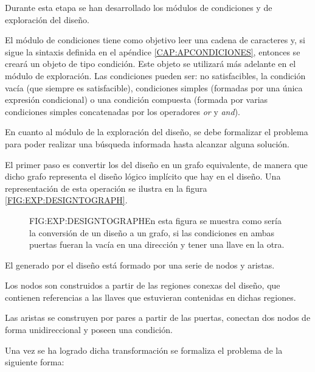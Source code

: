 Durante esta etapa se han desarrollado los módulos de condiciones y de exploración del diseño.

El módulo de condiciones tiene como objetivo leer una cadena de caracteres y, si sigue la sintaxis definida en el apéndice \ref{CAP:APCONDICIONES}, entonces se creará un objeto de tipo condición. Este objeto se utilizará más adelante en el módulo de exploración. Las condiciones pueden ser: no satisfacibles, la condición vacía (que siempre es satisfacible), condiciones simples (formadas por una única expresión condicional) o una condición compuesta (formada por varias condiciones simples concatenadas por los operadores \textit{or} y \textit{and}).

En cuanto al módulo de la exploración del diseño, se debe formalizar el problema para poder realizar una búsqueda informada hasta alcanzar alguna solución.

El primer paso es convertir los  del diseño en un grafo equivalente, de manera que dicho grafo representa el diseño lógico implícito que hay en el diseño. Una representación de esta operación se ilustra en la figura \ref{FIG:EXP:DESIGNTOGRAPH}.

\begin{figure}{FIG:EXP:DESIGNTOGRAPH}{En esta figura se muestra como sería la conversión de un diseño a un grafo, si las condiciones en ambas puertas fueran la vacía en una dirección y tener una llave en la otra.}
	 \quad
\end{figure}

El  generado por el diseño está formado por una serie de nodos y aristas.\newline

Los nodos son construidos a partir de las regiones conexas del diseño, que contienen referencias a las llaves que estuvieran contenidas en dichas regiones.\newline

Las aristas se construyen por pares a partir de las puertas, conectan dos nodos de forma unidireccional y poseen una condición.


Una vez se ha logrado dicha transformación se formaliza el problema de la siguiente forma:

